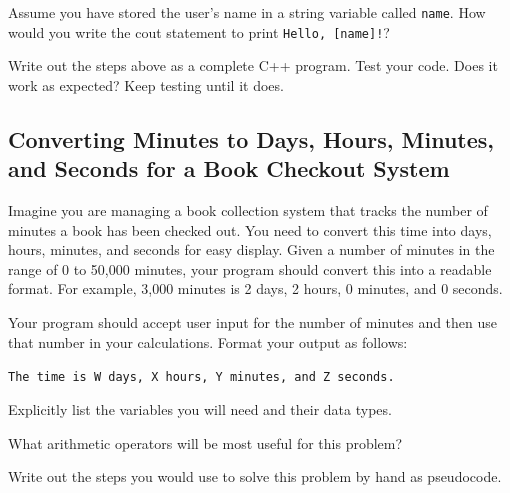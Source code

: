 \begin{multipart}
    Assume you have stored the user's name in a string variable called \texttt{name}. How would you write the cout statement to print \texttt{Hello, [name]!}?
\end{multipart}

\vspace{3cm}

\begin{multipart}
    Write out the steps above as a complete C++ program. Test your code. Does it work as expected? Keep testing until it does. 
\end{multipart}

\subsection{Converting Minutes to Days, Hours, Minutes, and Seconds for a Book Checkout System}
Imagine you are managing a book collection system that tracks the number of minutes a book has been checked out. You need to convert this time into days, hours, minutes, and seconds for easy display. Given a number of minutes in the range of 0 to 50,000 minutes, your program should convert this into a readable format. For example, 3,000 minutes is 2 days, 2 hours, 0 minutes, and 0 seconds.

Your program should accept user input for the number of minutes and then use that number in your calculations. Format your output as follows: 

\texttt{The time is W days, X hours, Y minutes, and Z seconds.}

\begin{multipart}
    Explicitly list the variables you will need and their data types. 
\end{multipart}

\vspace{3cm}

\begin{multipart}
    What arithmetic operators will be most useful for this problem?
\end{multipart}

\vspace{2cm}

\begin{multipart}
    Write out the steps you would use to solve this problem by hand as pseudocode. 
\end{multipart}

\vspace{5cm}

